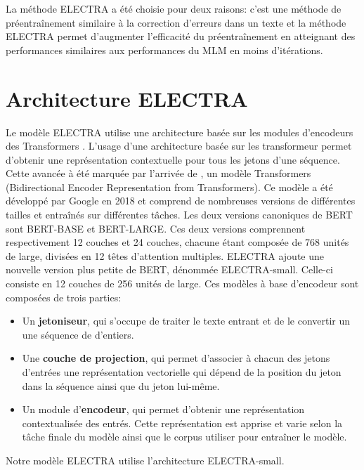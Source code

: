 \documentclass[12pt,twoside,maitrise]{dms}
\theoremstyle{definition}
\numberwithin{equation}{section}
\numberwithin{table}{chapter}
\numberwithin{figure}{chapter}
\begin{document}
La méthode ELECTRA a été choisie pour deux raisons: c'est une méthode de
préentraînement similaire à la correction d'erreurs dans un texte et la méthode
ELECTRA permet d'augmenter l'efficacité du préentraînement en atteignant des
performances similaires aux performances du MLM en moins d'itérations.


\section{Architecture ELECTRA}
Le modèle ELECTRA utilise une architecture basée sur les modules d'encodeurs
des Transformers \cite{vaswani2023attentionneed}. L'usage d'une architecture
basée sur les transformeur permet d'obtenir une représentation contextuelle
pour tous les jetons d'une séquence. Cette avancée à été marquée par l'arrivée
de \cite{bert},  un modèle Transformers (Bidirectional Encoder Representation
from Transformers). Ce modèle a été développé par Google en 2018 et comprend de
nombreuses versions de différentes tailles et entraînés sur différentes tâches.
Les deux versions canoniques de BERT sont BERT-BASE et BERT-LARGE. Ces deux
versions comprennent respectivement 12 couches et 24 couches, chacune étant
composée de 768 unités de large, divisées en 12 têtes d’attention multiples.
ELECTRA ajoute une nouvelle version plus petite de BERT, dénommée
ELECTRA-small. Celle-ci consiste en 12 couches de 256 unités de large. Ces
modèles à base d'encodeur sont composées de trois parties:
\begin{itemize}
	\item Un \textbf{jetoniseur}, qui s'occupe de traiter le texte entrant et
	      de le convertir un une séquence de d'entiers.
	\item Une \textbf{couche de projection}, qui permet d'associer à chacun des
	      jetons d'entrées une représentation vectorielle qui dépend de la
	      position du jeton dans la séquence ainsi que du jeton lui-même.
	\item Un module d'\textbf{encodeur}, qui permet d'obtenir une
	      représentation contextualisée des entrés. Cette représentation est
	      apprise et varie selon la tâche finale du modèle ainsi que le corpus
	      utiliser pour entraîner le modèle.
\end{itemize}
Notre modèle ELECTRA utilise l'architecture ELECTRA-small.
\end{document}
